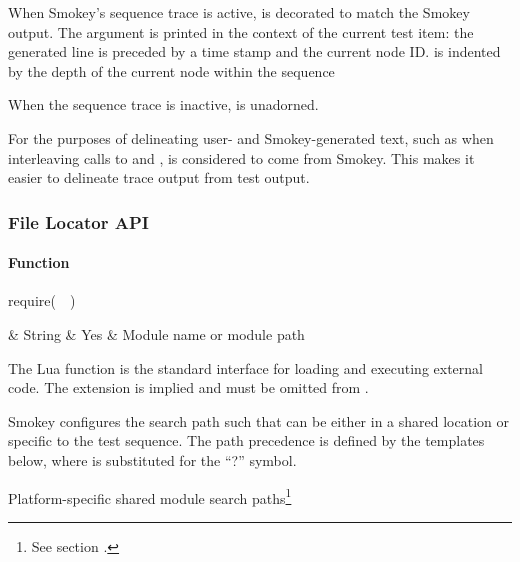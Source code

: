 When Smokey's sequence trace is active,  is decorated to match
the Smokey output.  The argument  is printed in the context of
the current test item: the generated line is preceded by a time stamp and the
current node ID.   is indented by the depth of the current node
within the sequence

When the sequence trace is inactive,  is unadorned.

For the purposes of delineating user- and Smokey-generated text, such as when
interleaving calls to  and , 
is considered to come from Smokey.  This makes it easier to delineate trace
output from test output.

\subsubsection{File Locator API}
\label{sec:FileLocatorApi}

\paragraph{ Function}

\begin{minipage}{\linewidth}
\begin{SmokeyApi}
require(~~)
\end{SmokeyApi}

\begin{ApiTable}
	 & String & Yes & Module name or module path \\
\end{ApiTable}
\end{minipage}

The Lua  function is the standard interface for loading and
executing external code.  The  extension is implied and must be
omitted from .

Smokey configures the search path such that  can be either in a
shared location or specific to the test sequence.  The path precedence is
defined by the templates below, where  is substituted for the
``?'' symbol.

\begin{SearchPaths}

	\item[] Platform-specific shared module search paths\footnote{See
	section .}

	\item {\LstStyle{}}
	\item {\LstStyle{}}
	\item {\LstStyle{}}
	\item {\LstStyle{}}

\end{SearchPaths}

